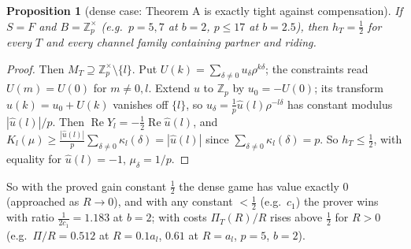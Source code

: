 \documentclass[11pt]{article}
\newtheorem{proposition}[theorem]{Proposition}
\theoremstyle{definition}
\renewcommand{\Re}{\operatorname{Re}}
\begin{document}
\begin{proposition}[dense case: Theorem A is exactly tight against compensation]\label{prop:dense}
If $S=F$ and $B=\mathbb Z_p^\times$ (e.g.\ $p=5,7$ at $b=2$, $p\le17$ at $b=2.5$), then $h_T=\frac12$ for every $T$ and every channel family containing
partner and riding.
\end{proposition}
\begin{proof}
Then $M_T\supseteq\mathbb Z_p^\times\setminus\{l\}$.  Put $U(k)=\sum_{\delta\ne0}u_\delta\rho^{k\delta}$; the constraints read $U(m)=U(0)$ for $m\ne0,l$.  Extend
$u$ to $\mathbb Z_p$ by $u_0=-U(0)$; its transform $\hat u(k)=u_0+U(k)$ vanishes off $\{l\}$, so $u_\delta=\frac1p\hat u(l)\rho^{-l\delta}$ has constant modulus
$|\hat u(l)|/p$.  Then $\Re Y_l=-\frac12\Re\hat u(l)$, and $K_l(\mu)\ge\frac{|\hat u(l)|}p\sum_{\delta\ne0}\kappa_l(\delta)=|\hat u(l)|$ since
$\sum_{\delta\ne0}\kappa_l(\delta)=p$.  So $h_T\le\frac12$, with equality for $\hat u(l)=-1$, $\mu_\delta=1/p$.
\end{proof}
So with the proved gain constant $\frac12$ the dense game has value exactly $0$ (approached as $R\to0$), and with any constant $<\frac12$ (e.g.\
$c_1$) the prover wins with ratio $\frac1{2c_1}=1.183$ at $b=2$; with costs $\Pi_T(R)/R$ rises above $\frac12$ for $R>0$ (e.g.\ $\Pi/R=0.512$ at $R=0.1a_l$, $0.61$ at $R=a_l$, $p=5$, $b=2$).
\end{document}
